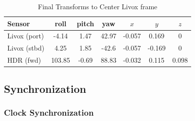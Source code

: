 \begin{table}[ht]
\caption{Final Transforms to Center Livox frame}
\label{extrinsics}
\centering
\begin{tabular}{l|cccccc}
Sensor &  roll & pitch & yaw & $x$ & $y$ & $z$\\
\hline \hline 
Livox (port)  & -4.14 & 1.47 & 42.97 & -0.057 & 0.169 & 0\\ \hline
Livox (stbd) & 4.25 & 1.85 & -42.6 & -0.057 & -0.169 & 0\\ \hline
\hline

HDR (fwd) & 103.85 & -0.69 & 88.83 & -0.032 &0.115 & 0.098\\ \hline
\end{tabular} \label{tbl:extrinsic}
\end{table}
            
        \subsection{Synchronization} \label{sync}
        
            \subsubsection{Clock Synchronization} \label{clock_sync}

